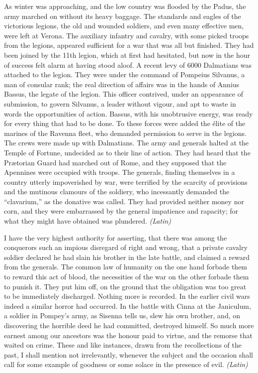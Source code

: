 
As winter was approaching, and the low country was flooded by the Padus, the army marched on without its heavy baggage. The standards and eagles of the victorious legions, the old and wounded soldiers, and even many effective men, were left at Verona. The auxiliary infantry and cavalry, with some picked troops from the legions, appeared sufficient for a war that was all but finished. They had been joined by the 11th legion, which at first had hesitated, but now in the hour of success felt alarm at having stood aloof. A recent levy of 6000 Dalmatians was attached to the legion. They were under the command of Pompeius Silvanus, a man of consular rank; the real direction of affairs was in the hands of Annius Bassus, the legate of the legion. This officer contrived, under an appearance of submission, to govern Silvanus, a leader without vigour, and apt to waste in words the opportunities of action. Bassus, with his unobtrusive energy, was ready for every thing that had to be done. To these forces were added the élite of the marines of the Ravenna fleet, who demanded permission to serve in the legions. The crews were made up with Dalmatians. The army and generals halted at the Temple of Fortune, undecided as to their line of action. They had heard that the Prætorian Guard had marched out of Rome, and they supposed that the Apennines were occupied with troops. The generals, finding themselves in a country utterly impoverished by war, were terrified by the scarcity of provisions and the mutinous clamours of the soldiery, who incessantly demanded the ``clavarium,'' as the donative was called. They had provided neither money nor corn, and they were embarrassed by the general impatience and rapacity; for what they might have obtained was plundered. \emph{(Latin)}


I have the very highest authority for asserting, that there was among the conquerors such an impious disregard of right and wrong, that a private cavalry soldier declared he had slain his brother in the late battle, and claimed a reward from the generals. The common law of humanity on the one hand forbade them to reward this act of blood, the necessities of the war on the other forbade them to punish it. They put him off, on the ground that the obligation was too great to be immediately discharged. Nothing more is recorded. In the earlier civil wars indeed a similar horror had occurred. In the battle with Cinna at the Janiculum, a soldier in Pompey's army, as Sisenna tells us, slew his own brother, and, on discovering the horrible deed he had committed, destroyed himself. So much more earnest among our ancestors was the honour paid to virtue, and the remorse that waited on crime. These and like instances, drawn from the recollections of the past, I shall mention not irrelevantly, whenever the subject and the occasion shall call for some example of goodness or some solace in the presence of evil. \emph{(Latin)}

